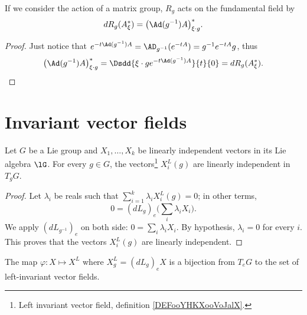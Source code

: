 \begin{lemma}
	If we consider the action of a matrix group, $R_g$ acts on the fundamental field by
	\[
		dR_g(A^*_{\xi})=\big( \Ad(g^{-1})A \big)^*_{\xi\cdot g}.
	\]
	\label{lem:dRgAstar}
\end{lemma}

\begin{proof}
	Just notice that $e^{-t\Ad(g^{-1})A}=\AD_{g^{-1}}(e^{-tA})=g^{-1} e^{-tA}g$, thus
	\begin{equation}
		\big( \Ad(g^{-1})A \big)^*_{\xi\cdot g}=\Dsdd{ \xi\cdot ge^{-t\Ad(g^{-1})A} }{t}{0}=dR_g(A^*_{\xi}).
	\end{equation}
\end{proof}

\section{Invariant vector fields}


\begin{lemma}       \label{LEMooWTNRooCjlYMJ}
	Let \( G\) be a Lie group and \( X_1,\ldots, X_k\) be linearly independent vectors in its Lie algebra \( \lG\). For every \( g\in G\), the vectors\footnote{Left invariant vector field, definition \ref{DEFooYHKXooVoJalX}.} \( X_i^L(g)\) are linearly independent in \( T_gG\).
\end{lemma}

\begin{proof}
	Let \( \lambda_i\) be reals such that \( \sum_{i=1}^k\lambda_iX_i^L(g)=0\); in other terms,
	\begin{equation}
		0=(dL_g)_e\big( \sum_i\lambda_iX_i \big).
	\end{equation}
	We apply \( (dL_{g^{-1}})_e\) on both side: \( 0=\sum_i\lambda_iX_i\). By hypothesis, \( \lambda_i=0\) for every \( i\). This proves that the vectors \( X^L_i(g)\) are linearly independent.
\end{proof}

\begin{theorem}
	The map \( \varphi\colon X\mapsto X^L\) where \( X^L_g=(dL_g)_eX\) is a bijection from \( T_eG\) to the set of left-invariant vector fields.
\end{theorem}

